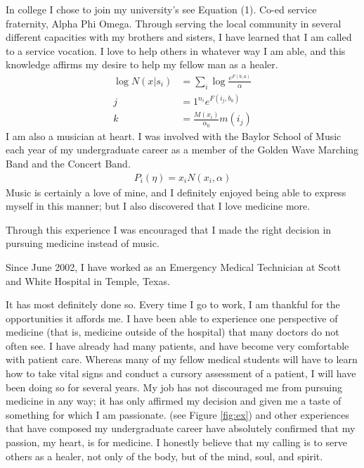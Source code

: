 \documentclass[final]{clv2025}
\begin{document}
In college I chose to join my university's see Equation (1). Co-ed service fraternity, Alpha Phi Omega. Through serving the local community in several different capacities with my brothers and sisters, I have learned that I am called to a service vocation. I love to help others in whatever way I am able, and this knowledge affirms my desire to help my fellow man as a healer.
\begin{align}
\log N(x|s_i)&=\sum_i \log \frac{e^{F(b,a)}}{\alpha}\nonumber
\\
j&=1^{n_i}e^{F(i_j,b_a)}\nonumber
\\
k&=\frac{M(x_i)}{\alpha_0}m(i_j)\nonumber
\end{align}
I am also a musician at heart. I was involved with the Baylor School of Music each year of my undergraduate career as a member of the Golden Wave Marching Band and the Concert Band.
\begin{align}
P_i(\eta)=x_i N(x_i,\alpha)
\end{align}
Music is certainly a love of mine, and I definitely enjoyed being able to express myself
in this manner; but I also discovered that I love medicine more.
\begin{algorithm}
\item[Step 1] Through this experience I was encouraged that I made the right decision in pursuing medicine instead of music.
\item[Step 2] Since June 2002, I have worked as an Emergency Medical Technician at Scott and White Hospital in Temple, Texas.
\end{algorithm}
It has most definitely done so. Every time I go to work, I am thankful for the opportunities it affords me. I have been able to experience one perspective of medicine (that is, medicine outside of the hospital) that many doctors do not often see. I have already had many patients, and have become very comfortable with patient care. Whereas many of my fellow medical students will have to learn how to take vital signs and conduct a cursory assessment of a patient, I will have been doing so for several years. My job has not discouraged me from pursuing medicine in any way; it has only affirmed my decision and given me a taste of something for which I am passionate. (see Figure \ref{fig:ex}) and other experiences that have composed my undergraduate career have absolutely confirmed that my passion, my heart, is for medicine. I honestly believe that my calling is to serve others as a healer, not only of the body, but of the mind, soul, and spirit.
\end{document}
